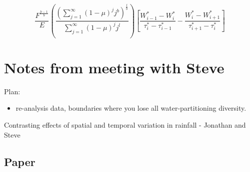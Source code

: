\documentclass[11pt]{article}
\begin{document}
\begin{equation}
\frac{F^{\frac{b-1}{b}}}{E}\left(\frac{\left(\sum_{j=1}^{\infty}(1-\mu)^{j}j^b\right)^{\frac{l}{b}}}{\sum_{j=1}^{\infty}(1-\mu)^{j}j^l}\right) \left[\frac{W^*_{i-1} - W^*_i}{\tau^*_i - \tau^*_{i-1}} - \frac{W^*_i - W^*_{i+1}}{\tau^*_{i+1} - \tau^*_i} \right]
\end{equation}


\section{Notes from meeting with Steve}
\label{sec:org7e45664}


Plan:

\begin{itemize}
\item re-analysis data, boundaries where you lose all water-partitioning diversity.
\end{itemize}



Contrasting effects of spatial and temporal variation in rainfall - Jonathan and Steve



\subsection{Paper}
\label{sec:org19b04c5}
\end{document}

